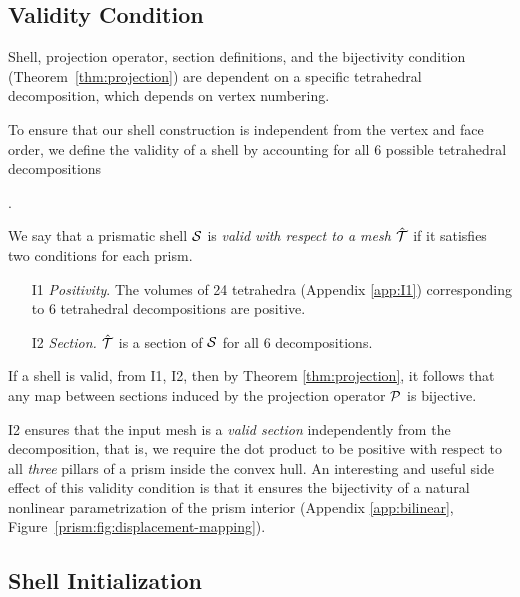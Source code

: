 {
\subsection{Validity Condition}
\label{prism:sec:strong}

Shell, projection operator, section definitions, and the bijectivity condition (Theorem~\ref{thm:projection}) are dependent on a specific tetrahedral decomposition, which depends on vertex numbering.

To ensure that our shell construction is independent from the vertex and face order, we define the validity of a shell by accounting for all 6 possible tetrahedral decompositions \cite[Figure 4]{dompierre1999subdivide}}.

\begin{definition}\label{def:validshell}
We say that a prismatic shell $\S$ is \emph{valid with respect to a mesh $\hat\T$} if it satisfies two conditions for each prism.
\begin{enumerate}
    \item[I1] \emph{Positivity}. The volumes of  24 tetrahedra (Appendix \ref{app:I1}) corresponding to  6 tetrahedral decompositions are positive.
    \item[I2] \emph{Section.} $\hat\T$ is a section of $\S$ for all 6 decompositions.
\end{enumerate}
\end{definition}
If a shell is valid, from I1, I2, then by Theorem \ref{thm:projection}, it follows that any map between sections induced by the projection operator $\P$ is bijective.

I2 ensures that the input mesh is a \emph{valid section} independently from the decomposition, that is, we require the dot product to be positive with respect to all \emph{three} pillars of a prism inside the convex hull. An interesting and useful side effect of this validity condition is that it ensures the bijectivity of a natural nonlinear parametrization of the prism interior (Appendix \ref{app:bilinear}, Figure~\ref{prism:fig:displacement-mapping}).

\subsection{Shell Initialization}
\label{prism:sec:initialization}

